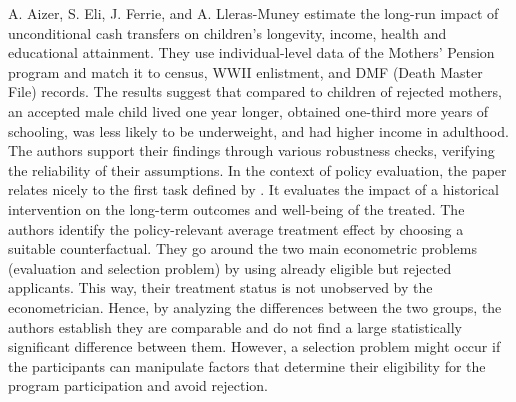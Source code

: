 A. Aizer, S. Eli, J. Ferrie, and A. Lleras-Muney estimate the long-run
impact of unconditional cash transfers on children's longevity, income,
health and educational attainment. They use individual-level data of
the Mothers' Pension program and match it to census, WWII enlistment,
and DMF (Death Master File) records. The results suggest that compared
to children of rejected mothers, an accepted male child lived one year
longer, obtained one-third more years of schooling, was less likely to
be underweight, and had higher income in adulthood. The authors support their
findings through various robustness checks, verifying the reliability
of their assumptions. In the context of policy evaluation, the paper 
relates nicely to the first task defined by \citet{heckman2008econometric}. It evaluates the impact of a historical intervention on the long-term outcomes and well-being of the treated. The authors identify the policy-relevant average treatment effect by choosing a suitable counterfactual. They go around the two main econometric problems (evaluation and selection problem) by using already eligible but rejected applicants. This way, their treatment status is not unobserved by the econometrician. Hence, by analyzing the differences between the two groups, the authors establish they are comparable and do not find a large statistically significant difference between them. However, a selection problem might occur if the participants can manipulate factors that determine their eligibility for the program participation and avoid rejection.